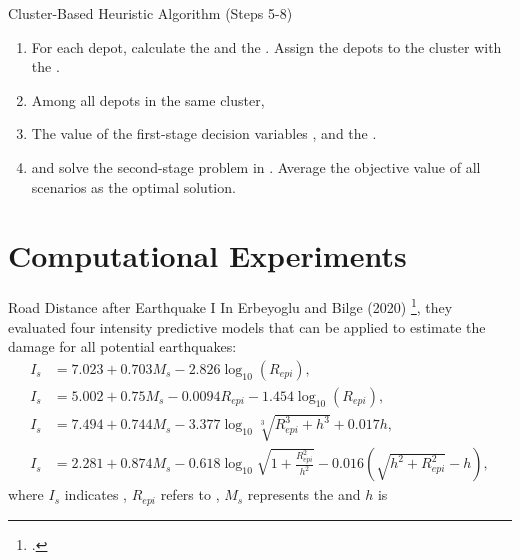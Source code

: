 \documentclass[aspectratio=169]{beamer}
\begin{document}
\begin{frame}{Cluster-Based Heuristic Algorithm (Steps 5-8)}
    \begin{enumerate}[resume, start=5,itemsep=0em]
        \item For each depot, calculate the  and the . Assign the depots to the cluster with the .
        \item Among all depots in the same cluster, 
        \item The value of the first-stage decision variables , and the .
        \item {} and solve the second-stage problem in . Average the objective value of all scenarios as the optimal solution.
    \end{enumerate}
\end{frame}

\section{Computational Experiments}
\begin{frame}{Road Distance after Earthquake I}
In Erbeyoglu and Bilge (2020) \footcite{erbeyouglu2020earthquake}, they evaluated four intensity predictive models that can be applied to estimate the damage for all potential earthquakes:
\begin{subequations}
    \begin{align}
    I_s &= 7.023 + 0.703 M_s - 2.826  \log_{10}(R_{epi}), \label{eq:MSK_1} \\
    I_s &= 5.002 + 0.75 M_s - 0.0094  R_{epi} - 1.454 \log_{10}(R_{epi}) \label{eq:MSK_2}, \\
    I_s &= 7.494 + 0.744 M_s - 3.377 \log_{10} \sqrt[3]{R_{epi}^3 + h^3} + 0.017 h \label{eq:MSK_3}, \\
    I_s &= 2.281 + 0.874 M_s - 0.618 \log_{10} \sqrt{1+\frac{R_{epi}^2}{h^2}} - 0.016 \left(\sqrt{h^2 + R_{epi}^2} - h\right) \label{eq:MSK_4},
    \end{align}
\end{subequations}
where $I_s$ indicates , $R_{epi}$ refers to , $M_s$ represents the  and $h$ is  
\end{frame}
\end{document}

